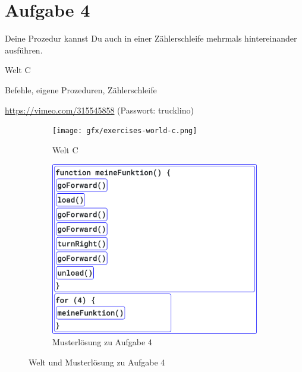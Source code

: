 \pagebreak

\section{Aufgabe 4}
\label{sec:exercises:4}

Deine Prozedur kannst Du auch in einer Zählerschleife mehrmals hintereinander ausführen.

\begin{description}[noitemsep]
  \item[Welt wählen:] Welt C
  \item[Du brauchst:] Befehle, eigene Prozeduren, Zählerschleife
  \item[Video:] \url{https://vimeo.com/315545858} (Passwort: trucklino)
\end{description}

\begin{figure}[H]
  \begin{subfigure}[b]{0.40\textwidth}
    \texttt{[image: gfx/exercises-world-c.png]}
    \caption{Welt C}
  \end{subfigure}\hfill
  \begin{subfigure}[b]{0.40\textwidth}
    \includegraphics[width=\textwidth]{gfx/exercises-program-4.png}
    \caption{Musterlösung zu Aufgabe 4}
  \end{subfigure}\hfill
  \caption{Welt und Musterlösung zu Aufgabe 4}
\end{figure}

\pagebreak

